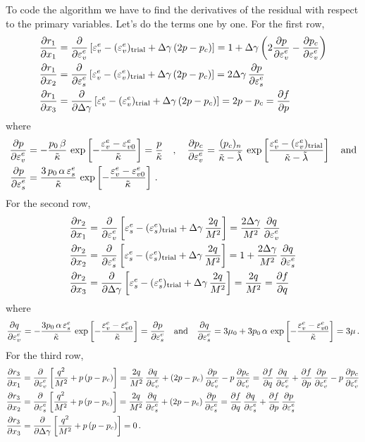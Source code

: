 To code the algorithm we have to find the derivatives of the residual with respect to the primary variables.
Let's do the terms one by one.  For the first row,
\[
  \Bal
  \Partial{r_1}{x_1} & = \Partial{}{\Ve_v^e}\left[\Ve_v^e -  (\Ve_v^e)_\Trial + \Delta\gamma\,(2p-p_c)\right] 
     = 1 + \Delta\gamma\left(2\Partial{p}{\Ve_v^e} - \Partial{p_c}{\Ve_v^e}\right) \\
  \Partial{r_1}{x_2} & = \Partial{}{\Ve_s^e}\left[\Ve_v^e -  (\Ve_v^e)_\Trial + \Delta\gamma\,(2p-p_c)\right] 
     = 2\Delta\gamma\,\Partial{p}{\Ve_s^e}\\
  \Partial{r_1}{x_3} & = \Partial{}{\Delta\gamma}\left[\Ve_v^e -  (\Ve_v^e)_\Trial + \Delta\gamma\,(2p-p_c)\right]
     = 2p - p_c = \Partial{f}{p}
  \Eal
\]
where
\[
  \Bal
   \Partial{p}{\Ve_v^e} & = -\frac{p_0\,\beta}{\kappatilde}\,\exp\left[-\frac{\Ve_v^e - \Ve_{v0}^e}{\kappatilde}\right] = \frac{p}{\kappatilde} \quad, \quad
   \Partial{p_c}{\Ve_v^e} = \frac{(p_c)_n}{\kappatilde-\lambdatilde}\,\exp\left[\frac{\Ve_v^e - (\Ve_{v}^e)_\Trial}{\kappatilde-\lambdatilde}\right] \quad \Tand \\
   \Partial{p}{\Ve_s^e} & = \frac{3\,p_0\,\alpha\,\Ve_s^e}{\kappatilde}\,\exp\left[-\frac{\Ve_v^e - \Ve_{v0}^e}{\kappatilde}\right] \,.
  \Eal
\]
For the second row,
\[
  \Bal
  \Partial{r_2}{x_1} & = \Partial{}{\Ve_v^e}\left[\Ve_s^e -  (\Ve_s^e)_\Trial + \Delta\gamma\,\frac{2q}{M^2}\right] 
     = \frac{2\Delta\gamma}{M^2}\,\Partial{q}{\Ve_v^e} \\
  \Partial{r_2}{x_2} & = \Partial{}{\Ve_s^e}\left[\Ve_s^e -  (\Ve_s^e)_\Trial + \Delta\gamma\,\frac{2q}{M^2}\right] 
     = 1 + \frac{2\Delta\gamma}{M^2}\,\Partial{q}{\Ve_s^e}\\
  \Partial{r_2}{x_3} & = \Partial{}{\Delta\gamma}\left[\Ve_s^e -  (\Ve_s^e)_\Trial + \Delta\gamma\,\frac{2q}{M^2}\right]
     = \frac{2q}{M^2} = \Partial{f}{q}
  \Eal
\]
where
\[
  \Partial{q}{\Ve_v^e} = -\frac{3p_0\,\alpha\,\Ve_s^e}{\kappatilde}\,\exp\left[-\frac{\Ve_v^e - \Ve_{v0}^e}{\kappatilde}\right] = \Partial{p}{\Ve_s^e}
  \quad \Tand \quad 
  \Partial{q}{\Ve_s^e} = 3\mu_0 + 3p_0\,\alpha\,\exp\left[-\frac{\Ve_v^e - \Ve_{v0}^e}{\kappatilde}\right] = 3\mu \,.
\]
For the third row, 
\[
  \Bal
  \Partial{r_3}{x_1} & = \Partial{}{\Ve_v^e}\left[\frac{q^2}{M^2} + p\,(p - p_c)\right]
     = \frac{2q}{M^2}\,\Partial{q}{\Ve_v^e} + (2p - p_c)\,\Partial{p}{\Ve_v^e} - p\,\Partial{p_c}{\Ve_v^e} 
     = \Partial{f}{q}\,\Partial{q}{\Ve_v^e} + \Partial{f}{p}\,\Partial{p}{\Ve_v^e} - p\,\Partial{p_c}{\Ve_v^e} \\
  \Partial{r_3}{x_2} & = \Partial{}{\Ve_s^e}\left[\frac{q^2}{M^2} + p\,(p - p_c)\right]
     = \frac{2q}{M^2}\,\Partial{q}{\Ve_s^e} + (2p - p_c)\,\Partial{p}{\Ve_s^e} 
     = \Partial{f}{q}\,\Partial{q}{\Ve_s^e} + \Partial{f}{p}\,\Partial{p}{\Ve_s^e} \\
  \Partial{r_3}{x_3} & = \Partial{}{\Delta\gamma}\left[\frac{q^2}{M^2} + p\,(p - p_c)\right]
     =  0 \,.
  \Eal
\]
